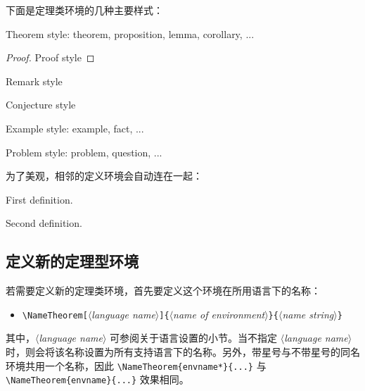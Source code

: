 \documentclass[Chinese,English,French,allowbf,puretext]{lebhart}
\theoremstyle{basic}
\theoremstyle{emphasis}
\theoremstyle{simple}
\providecommand{\meta}[1]{$\langle${\normalfont\itshape#1}$\rangle$}
\begin{document}
\bigskip
下面是定理类环境的几种主要样式：
\begin{theorem}
    Theorem style: theorem, proposition, lemma, corollary, ...
\end{theorem}

\begin{proof}
    Proof style
\end{proof}

\begin{remark}
    Remark style
\end{remark}

\begin{conjecture}
    Conjecture style
\end{conjecture}

\begin{example*}
    Example style: example, fact, ...
\end{example*}

\begin{problem}
    Problem style: problem, question, ...
\end{problem}

\medskip
为了美观，相邻的定义环境会自动连在一起：
\begin{definition}
    First definition.
\end{definition}

\begin{definition}
    Second definition.
\end{definition}



\subsection{定义新的定理型环境}

若需要定义新的定理类环境，首先要定义这个环境在所用语言下的名称：
\begin{itemize}
    \item \lstinline|\NameTheorem[|\meta{language name}\lstinline|]{|\meta{name of environment}\lstinline|}{|\meta{name string}\lstinline|}|
\end{itemize}
其中，\meta{language name} 可参阅关于语言设置的小节。当不指定 \meta{language name}时，则会将该名称设置为所有支持语言下的名称。另外，带星号与不带星号的同名环境共用一个名称，因此 \lstinline|\NameTheorem{envname*}{...}| 与 \lstinline|\NameTheorem{envname}{...}| 效果相同。
\end{document}
